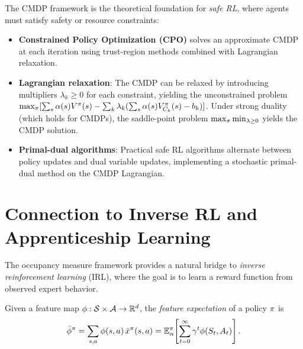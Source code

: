 \documentclass[11pt,a4paper]{article}
\begin{document}
\begin{rlconnection}[title={Constrained MDPs in Safe RL}]
The CMDP framework is the theoretical foundation for \emph{safe RL},
where agents must satisfy safety or resource constraints:
\begin{itemize}[nosep]
    \item \textbf{Constrained Policy Optimization (CPO)} solves
    an approximate CMDP at each iteration using trust-region
    methods combined with Lagrangian relaxation.
    \item \textbf{Lagrangian relaxation}: The CMDP can be relaxed
    by introducing multipliers $\lambda_k \geq 0$ for each
    constraint, yielding the unconstrained problem
    $\max_\pi [\sum_s \alpha(s) V^{\pi}(s) - \sum_k \lambda_k
    (\sum_s \alpha(s) V^\pi_{C_k}(s) - b_k)]$. Under strong
    duality (which holds for CMDPs), the saddle-point problem
    $\max_\pi \min_{\lambda \geq 0}$ yields the CMDP solution.
    \item \textbf{Primal-dual algorithms}: Practical safe RL
    algorithms alternate between policy updates and dual variable
    updates, implementing a stochastic primal-dual method on the
    CMDP Lagrangian.
\end{itemize}
\end{rlconnection}


\section{Connection to Inverse RL and Apprenticeship Learning}
\label{sec:inverse-rl}

The occupancy measure framework provides a natural bridge to
\emph{inverse reinforcement learning} (IRL), where the goal is
to learn a reward function from observed expert behavior.

\begin{definition}
\label{def:feature-expectations}
Given a feature map $\phi : \mathcal{S} \times \mathcal{A} \to \mathbb{R}^d$, the
\emph{feature expectation} of a policy $\pi$ is
\begin{equation}
\label{eq:feature-expect}
    \bar{\phi}^\pi = \sum_{s,a} \phi(s,a)\,
    \tilde{x}^\pi(s,a) = \mathbb{E}^\pi_\alpha\!\left[
    \sum_{t=0}^\infty \gamma^t \phi(S_t, A_t)\right].
\end{equation}
\end{definition}
\end{document}
